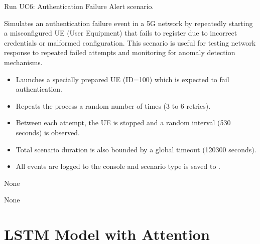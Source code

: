 \documentclass[letterpaper,10pt,english]{sphinxmanual}
\begin{document}
\begin{fulllineitems}
\label{\detokenize{uc6:uc6.run_uc6}}
\pysigstartsignatures
{}
\pysigstopsignatures
\sphinxAtStartPar
Run UC6: Authentication Failure Alert scenario.

\sphinxAtStartPar
Simulates an authentication failure event in a 5G network by repeatedly starting a misconfigured UE (User Equipment)
that fails to register due to incorrect credentials or malformed configuration. This scenario is useful for testing
network response to repeated failed attempts and monitoring for anomaly detection mechanisms.
\begin{description}
\begin{itemize}
\item {} 
\sphinxAtStartPar
Launches a specially prepared UE (ID=100) which is expected to fail authentication.

\item {} 
\sphinxAtStartPar
Repeats the process a random number of times (3 to 6 retries).

\item {} 
\sphinxAtStartPar
Between each attempt, the UE is stopped and a random interval (5\textendash{}30 seconds) is observed.

\item {} 
\sphinxAtStartPar
Total scenario duration is also bounded by a global timeout (120\textendash{}300 seconds).

\item {} 
\sphinxAtStartPar
All events are logged to the console and scenario type is saved to .

\end{itemize}

\sphinxAtStartPar
None

\sphinxAtStartPar
None

\end{description}

\end{fulllineitems}


\sphinxstepscope


\chapter{LSTM Model with Attention}
\label{\detokenize{lstm_attention_model:module-lstm_attention_model}}\label{\detokenize{lstm_attention_model:lstm-model-with-attention}}\label{\detokenize{lstm_attention_model::doc}}
\end{document}
